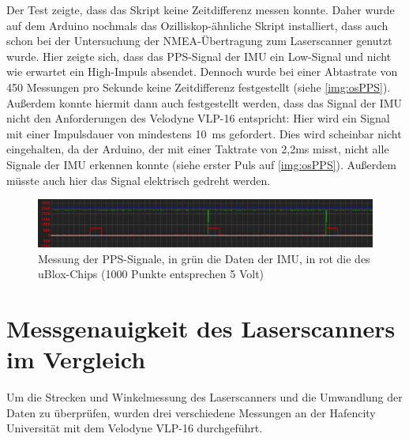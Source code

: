 \documentclass[a4paper,12pt,bibliography=totoc, listof=totoc,titlepage,pointlessnumbers]{scrreprt}
\begin{document}
Der Test zeigte, dass das Skript keine Zeitdifferenz messen konnte. Daher wurde auf dem Arduino nochmals das Ozilliskop-ähnliche Skript installiert, dass auch schon bei der Untersuchung der NMEA-Übertragung zum Laserscanner genutzt wurde. Hier zeigte sich, dass das PPS-Signal der IMU ein Low-Signal und nicht wie erwartet ein High-Impuls absendet. Dennoch wurde bei einer Abtastrate von 450 Messungen pro Sekunde keine Zeitdifferenz festgestellt (siehe \autoref{img:osPPS}). Außerdem konnte hiermit dann auch festgestellt werden, dass das Signal der IMU nicht den Anforderungen des Velodyne VLP-16 entspricht: Hier wird ein Signal mit einer Impulsdauer von mindestens 10~ms gefordert. Dies wird scheinbar nicht eingehalten, da der Arduino, der mit einer Taktrate von 2,2ms misst, nicht alle Signale der IMU erkennen konnte (siehe erster Puls auf \autoref{img:osPPS}). Außerdem müsste auch hier das Signal elektrisch gedreht werden.

\begin{figure}[!ht]
 \centering
 \includegraphics[width=1\textwidth]{./img/osziPPS.png}
 \caption{Messung der PPS-Signale, in grün die Daten der IMU, in rot die des uBlox-Chips (1000 Punkte entsprechen 5 Volt)}
 \label{img:osPPS}
\end{figure}

\section{Messgenauigkeit des Laser\-scan\-ners im Vergleich}
Um die Strecken und Winkelmessung des Laser\-scan\-ners und die Umwandlung der Daten zu überprüfen, wurden drei verschiedene Messungen an der Hafencity Universität mit dem Velodyne VLP-16 durchgeführt. 


\end{document}
